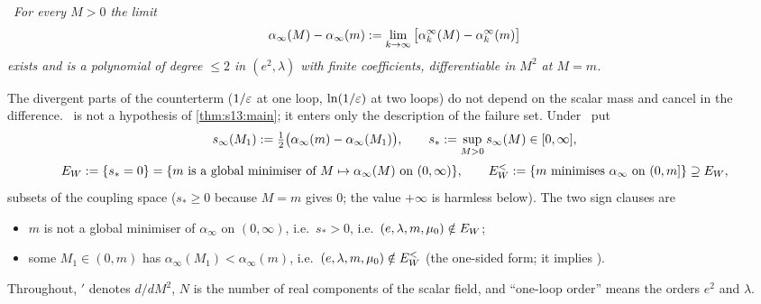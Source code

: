 \smallskip\noindent\sxivCT\ \emph{For every $M>0$ the limit
\[
\alpha_\infty(M)-\alpha_\infty(m):=\lim_{k\to\infty}\big[\alpha^\infty_k(M)-\alpha^\infty_k(m)\big]
\]
exists and is a polynomial of degree $\le2$ in $(e^2,\lambda)$ with finite coefficients, differentiable in $M^2$ at $M=m$.}

\smallskip\noindent The divergent parts of the counterterm ($1/\varepsilon$ at one loop, $\ln(1/\varepsilon)$ at two loops) do not depend on the scalar mass and cancel in the difference. \sxivCT\ is not a hypothesis of \cref{thm:s13:main}; it enters only the description of the failure set. Under \sxivCT\ put
\[
s_\infty(M_1):=\tfrac12\big(\alpha_\infty(m)-\alpha_\infty(M_1)\big),\qquad s_*:=\sup_{M>0}s_\infty(M)\in[0,\infty],
\]
\[
E_W:=\{s_*=0\}=\{m\text{ is a global minimiser of }M\mapsto\alpha_\infty(M)\text{ on }(0,\infty)\},\qquad
E^<_W:=\{m\text{ minimises }\alpha_\infty\text{ on }(0,m]\}\supseteq E_W,
\]
subsets of the coupling space ($s_*\ge0$ because $M=m$ gives $0$; the value $+\infty$ is harmless below). The two sign clauses are
\begin{itemize}[nosep,leftmargin=*]
\item[\sxivNE] $m$ is not a global minimiser of $\alpha_\infty$ on $(0,\infty)$, i.e.\ $s_*>0$, i.e.\ $(e,\lambda,m,\mu_0)\notin E_W$;
\item[\sxivNEl] some $M_1\in(0,m)$ has $\alpha_\infty(M_1)<\alpha_\infty(m)$, i.e.\ $(e,\lambda,m,\mu_0)\notin E^<_W$ (the one-sided form; it implies \sxivNE).
\end{itemize}
Throughout, $'$ denotes $d/dM^2$, $N$ is the number of real components of the scalar field, and ``one-loop order'' means the orders $e^2$ and $\lambda$.

